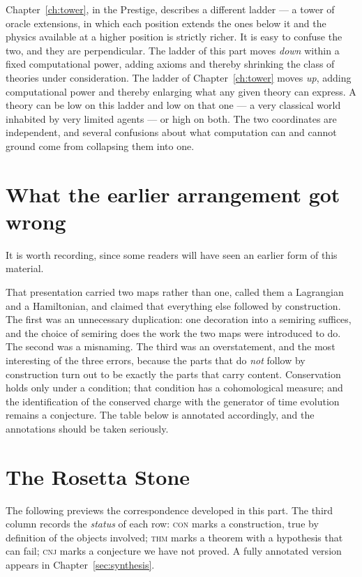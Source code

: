 \begin{remark}
\label{rmk:two-ladders}
Chapter~\ref{ch:tower}, in the Prestige, describes a different ladder ---
a tower of oracle extensions, in which each position extends the ones
below it and the physics available at a higher position is strictly
richer.
It is easy to confuse the two, and they are perpendicular.
The ladder of this part moves \emph{down} within a fixed computational
power, adding axioms and thereby shrinking the class of theories under
consideration.
The ladder of Chapter~\ref{ch:tower} moves \emph{up}, adding computational
power and thereby enlarging what any given theory can express.
A theory can be low on this ladder and low on that one --- a very
classical world inhabited by very limited agents --- or high on both.
The two coordinates are independent, and several confusions about what
computation can and cannot ground come from collapsing them into one.
\end{remark}

\section{What the earlier arrangement got wrong}

It is worth recording, since some readers will have seen an earlier form
of this material.

That presentation carried two maps rather than one, called them a
Lagrangian and a Hamiltonian, and claimed that everything else followed
by construction.
The first was an unnecessary duplication: one decoration into a semiring
suffices, and the choice of semiring does the work the two maps were
introduced to do.
The second was a misnaming.
The third was an overstatement, and the most interesting of the three
errors, because the parts that do \emph{not} follow by construction turn
out to be exactly the parts that carry content.
Conservation holds only under a condition; that condition has a
cohomological measure; and the identification of the conserved charge
with the generator of time evolution remains a conjecture.
The table below is annotated accordingly, and the annotations should be
taken seriously.

\section{The Rosetta Stone}
\label{sec:rosetta}

The following previews the correspondence developed in this part.
The third column records the \emph{status} of each row:
\textsc{con} marks a construction, true by definition of the objects
involved; \textsc{thm} marks a theorem with a hypothesis that can fail;
\textsc{cnj} marks a conjecture we have not proved.
A fully annotated version appears in Chapter~\ref{sec:synthesis}.

